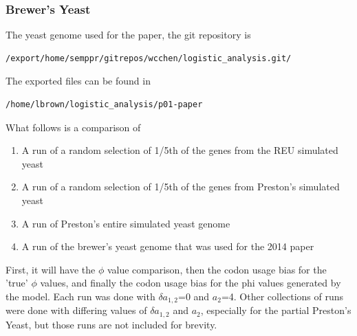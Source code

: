 \subsubsection{Brewer's Yeast}
The yeast genome used for the paper, the git repository is 
\begin{verbatim}
/export/home/semppr/gitrepos/wcchen/logistic_analysis.git/
\end{verbatim}

The exported files can be found in 

\begin{verbatim}
/home/lbrown/logistic_analysis/p01-paper
\end{verbatim}

What follows is a comparison of 

\begin{enumerate}
\item A run of a random selection of 1/5th of the genes from the REU simulated yeast
\item A run of a random selection of 1/5th of the genes from Preston's simulated yeast
\item A run of Preston's entire simulated yeast genome
\item A run of the brewer's yeast genome that was used for the 2014 paper
\end{enumerate}

First, it will have the $\phi$ value comparison, then the codon usage bias for the 'true' $\phi$ values, and finally the codon usage bias for the phi values generated by the model. Each run was done with $\delta a_{1,2}$=0 and $a_2$=4. Other collections of runs were done with differing values of $\delta a_{1,2}$ and $a_2$, especially for the partial Preston's Yeast, but those runs are not included for brevity.


















